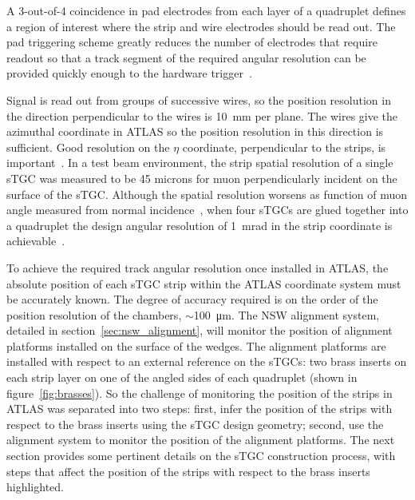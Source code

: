 A 3-out-of-4 coincidence in pad electrodes from each layer of a quadruplet defines a region of interest where the strip and wire electrodes should be read out. The pad triggering scheme greatly reduces the number of electrodes that require readout so that a track segment of the required angular resolution can be provided quickly enough to the hardware trigger~\cite{nsw_tdr}.

Signal is read out from groups of successive wires, so the position resolution in the direction perpendicular to the wires is \SI{10}{mm} per plane. The wires give the azimuthal coordinate in ATLAS so the position resolution in this direction is sufficient. Good resolution on the $\eta$ coordinate, perpendicular to the strips, is important~\cite{nsw_tdr}. In a test beam environment, the strip spatial resolution of a single sTGC was measured to be 45 microns for muon perpendicularly incident on the surface of the sTGC.  Although the spatial resolution worsens as function of muon angle measured from normal incidence~\cite{lefebvre_thesis}, when four sTGCs are glued together into a quadruplet the design angular resolution of \SI{1}{mrad} in the strip coordinate is achievable~\cite{nsw_tdr, perez-codina_small-strip_2016}. 

To achieve the required track angular resolution once installed in ATLAS, the absolute position of each sTGC strip within the ATLAS coordinate system must be accurately known. The degree of accuracy required is on the order of the position resolution of the chambers, $\sim$\SI{100}{\micro\meter}. The NSW alignment system, detailed in section~\ref{sec:nsw_alignment}, will monitor the position of alignment platforms installed on the surface of the wedges. The alignment platforms are installed with respect to an external reference on the sTGCs: two brass inserts on each strip layer on one of the angled sides of each quadruplet (shown in figure~\ref{fig:brasses}). So the challenge of monitoring the position of the strips in ATLAS was separated into two steps: first, infer the position of the strips with respect to the brass inserts using the sTGC design geometry; second, use the alignment system to monitor the position of the alignment platforms. The next section provides some pertinent details on the sTGC construction process, with steps that affect the position of the strips with respect to the brass inserts highlighted.

